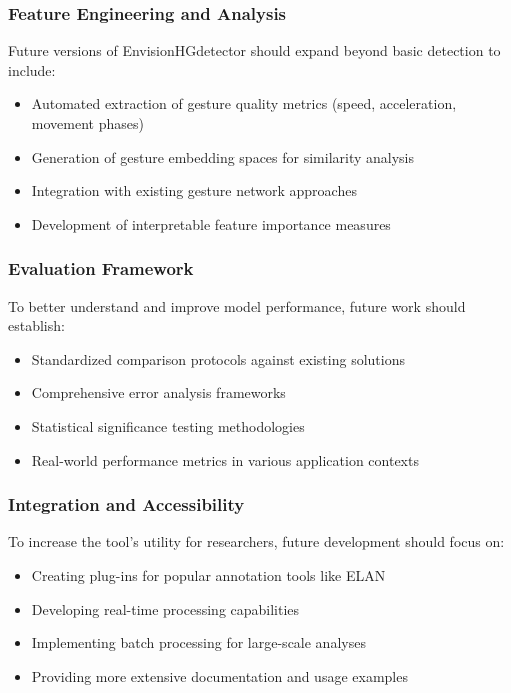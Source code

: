 \subsubsection{Feature Engineering and Analysis}
Future versions of EnvisionHGdetector should expand beyond basic detection to include:
\begin{itemize}
    \item Automated extraction of gesture quality metrics (speed, acceleration, movement phases)
    \item Generation of gesture embedding spaces for similarity analysis
    \item Integration with existing gesture network approaches \citep{pouwGestureNetworksIntroducing2019}
    \item Development of interpretable feature importance measures
\end{itemize}

\subsubsection{Evaluation Framework}
To better understand and improve model performance, future work should establish:
\begin{itemize}
    \item Standardized comparison protocols against existing solutions
    \item Comprehensive error analysis frameworks
    \item Statistical significance testing methodologies
    \item Real-world performance metrics in various application contexts
\end{itemize}

\subsubsection{Integration and Accessibility}
To increase the tool's utility for researchers, future development should focus on:
\begin{itemize}
    \item Creating plug-ins for popular annotation tools like ELAN
    \item Developing real-time processing capabilities
    \item Implementing batch processing for large-scale analyses
    \item Providing more extensive documentation and usage examples
\end{itemize}

